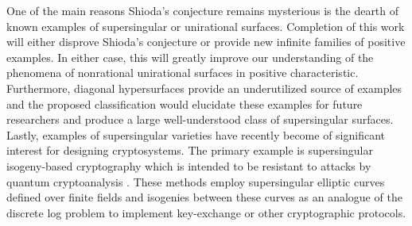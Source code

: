 \documentclass[12pt]{amsart}
\begin{document}
One of the main reasons Shioda's conjecture remains mysterious is the dearth of known examples of supersingular or unirational surfaces. Completion of this work will either disprove Shioda's conjecture or provide new infinite families of positive examples. In either case, this will greatly improve our understanding of the phenomena of nonrational unirational surfaces in positive characteristic. Furthermore, diagonal hypersurfaces provide an underutilized source of examples and the proposed classification would elucidate these examples for future researchers and produce a large well-understood class of supersingular surfaces. Lastly, examples of supersingular varieties have recently become of significant interest for designing cryptosystems. The primary example is supersingular isogeny-based cryptography which is intended to be resistant to attacks by quantum cryptoanalysis \cite{feo_supersingular_isogeny_crypto}. These methods employ supersingular elliptic curves defined over finite fields and isogenies between these curves as an analogue of the discrete log problem to implement key-exchange or other cryptographic protocols. 




\end{document}

